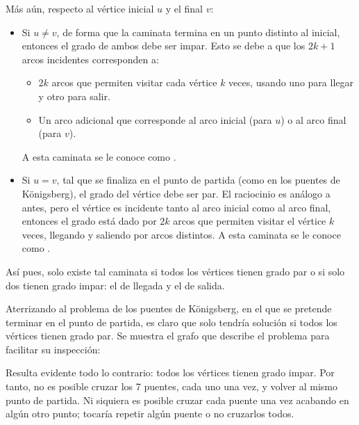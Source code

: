 Más aún, respecto al vértice inicial \(u\) y el final \(v\):
\begin{itemize}
  \item Si \(u \neq v\), de forma que la caminata termina en un punto distinto al inicial, entonces el grado de ambos debe ser impar. Esto se debe a que los $2k + 1$ arcos incidentes corresponden a:
  \begin{itemize}
    \item $2k$ arcos que permiten visitar cada vértice $k$ veces, usando uno para llegar y otro para salir.
    \item Un arco adicional que corresponde al arco inicial (para \(u\)) o al arco final (para \(v\)).
  \end{itemize}
  A esta caminata se le conoce como .
  \item Si \(u = v\), tal que se finaliza en el punto de partida (como en los puentes de Königsberg), el grado del vértice debe ser par. El raciocinio es análogo a antes, pero el vértice es incidente tanto al arco inicial como al arco final, entonces el grado está dado por $2k$ arcos que permiten visitar el vértice $k$ veces, llegando y saliendo por arcos distintos. A esta caminata se le conoce como .
\end{itemize}

Así pues, solo existe tal caminata si todos los vértices tienen grado par o si solo dos tienen grado impar: el de llegada y el de salida.  

Aterrizando al problema de los puentes de Königsberg, en el que se pretende terminar en el punto de partida, es claro que solo tendría solución si todos los vértices tienen grado par. Se muestra el grafo que describe el problema para facilitar su inspección:

Resulta evidente todo lo contrario: todos los vértices tienen grado impar. Por tanto, no es posible cruzar los 7 puentes, cada uno una vez, y volver al mismo punto de partida. Ni siquiera es posible cruzar cada puente una vez acabando en algún otro punto; tocaría repetir algún puente o no cruzarlos todos.